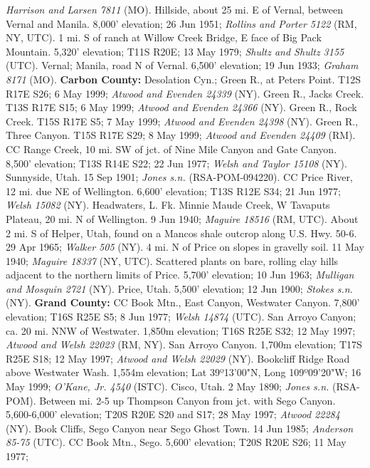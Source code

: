 \textit{Harrison and Larsen 7811} (MO).
Hillside, about 25 mi. E of Vernal, between Vernal and Manila. 8,000' elevation;
26 Jun 1951; \textit{Rollins and Porter 5122} (RM, NY, UTC).
1 mi. S of ranch at Willow Creek Bridge, E face of Big Pack Mountain.
5,320' elevation; T11S R20E; 13 May 1979; \textit{Shultz and Shultz 3155} (UTC).
Vernal; Manila, road N of Vernal. 6,500' elevation; 19 Jun 1933;
\textit{Graham 8171} (MO).
  \textbf{Carbon County:}
Desolation Cyn.; Green R., at Peters Point. T12S R17E S26; 6 May 1999;
\textit{Atwood and Evenden 24339} (NY).
Green R., Jacks Creek. T13S R17E S15; 6 May 1999;
\textit{Atwood and Evenden 24366} (NY).
Green R., Rock Creek. T15S R17E S5; 7 May 1999;
\textit{Atwood and Evenden 24398} (NY).
Green R., Three Canyon. T15S R17E S29; 8 May 1999;
\textit{Atwood and Evenden 24409} (RM).
CC Range Creek, 10 mi. SW of jct. of Nine Mile Canyon and Gate Canyon.
8,500' elevation; T13S R14E S22; 22 Jun 1977;
\textit{Welsh and Taylor 15108} (NY).
Sunnyside, Utah. 15 Sep 1901; \textit{Jones s.n.} (RSA-POM-094220).
CC Price River, 12 mi. due NE of Wellington. 6,600' elevation;  T13S R12E S34;
21 Jun 1977; \textit{Welsh 15082} (NY).
Headwaters, L. Fk. Minnie Maude Creek, W Tavaputs Plateau, 20 mi. N of
Wellington. 9 Jun 1940; \textit{Maguire 18516} (RM, UTC).
About 2 mi. S of Helper, Utah, found on a Mancos shale outcrop along U.S. Hwy.
50-6. 29 Apr 1965; \textit{Walker 505} (NY).
4 mi. N of Price on slopes in gravelly soil. 11 May 1940;
\textit{Maguire 18337} (NY, UTC).
Scattered plants on bare, rolling clay hills adjacent to the northern limits of
Price. 5,700' elevation; 10 Jun 1963; \textit{Mulligan and Mosquin 2721} (NY).
Price, Utah. 5,500' elevation; 12 Jun 1900; \textit{Stokes s.n.} (NY).
  \textbf{Grand County:}
CC Book Mtn., East Canyon, Westwater Canyon. 7,800' elevation; T16S R25E S5;
8 Jun 1977; \textit{Welsh 14874} (UTC).
San Arroyo Canyon; ca. 20 mi. NNW of Westwater. 1,850m elevation; T16S R25E S32;
12 May 1997; \textit{Atwood and Welsh 22023} (RM, NY).
San Arroyo Canyon. 1,700m elevation; T17S R25E S18; 12 May 1997;
\textit{Atwood and Welsh 22029} (NY).
Bookcliff Ridge Road above Westwater Wash. 1,554m elevation;
Lat 39º13'00"N, Long 109º09'20"W; 16 May 1999; \textit{O'Kane, Jr. 4540} (ISTC).
Cisco, Utah. 2 May 1890; \textit{Jones s.n.} (RSA-POM).
Between mi. 2-5 up Thompson Canyon from jct. with Sego Canyon.
5,600-6,000' elevation; T20S R20E S20 and S17; 28 May 1997;
\textit{Atwood 22284} (NY).
Book Cliffs, Sego Canyon near Sego Ghost Town. 14 Jun 1985;
\textit{Anderson 85-75} (UTC).
CC Book Mtn., Sego. 5,600' elevation; T20S R20E S26; 11 May 1977;
